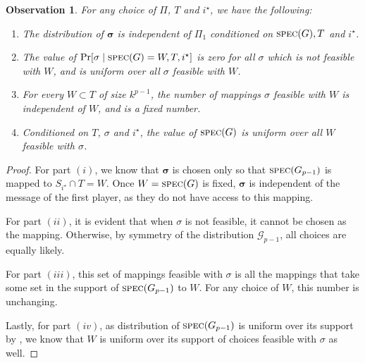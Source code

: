 \documentclass[11pt]{article}
\newtheorem{observation}[lemma]{Observation}
\theoremstyle{definition}
\DeclareMathOperator*{\Prob}{\ensuremath{\textnormal{Pr}}}
\renewcommand{\Pr}{\Prob}
\newcommand{\rv}[1]{\ensuremath{{\mathsf{#1}}}\xspace}
\newcommand{\cG}{\ensuremath{\mathcal{G}}}
\newcommand{\spec}{\ensuremath{\textnormal{\textsc{spec}}}}
\newcommand{\istar}{\ensuremath{i^{\star}}}
\newcommand{\Prot}{\ensuremath{\Pi}}
\newcommand{\rProt}{\ensuremath{\rv{\Prot}}}
\newcommand{\rsigma}{\ensuremath{\bm{\sigma}}}
\begin{document}
	\begin{observation}\label{obs:feasible-pair}
		For any choice of $\Prot$, $T$ and $\istar$, we have the following:
		\begin{enumerate}[label=$(\roman*)$]
			\item The distribution of $\rsigma$ is independent of $\rProt_1$ conditioned on $\spec(G), T$ and $\istar$. 
			\item The value of $\Pr[\sigma \mid \spec(G) = W, T, \istar]$ is zero for all $\sigma $ which is not feasible with $W$, and is uniform over all $\sigma$ feasible with $W$. 
			\item For every $W \subset T$ of size $k^{p-1}$, the number of mappings $\sigma$ feasible with $W$ is independent of $W$, and is a fixed number.
			\item Conditioned on $T$, $\sigma$ and $\istar$, the value of $\spec(G)$ is uniform over all $W$ feasible with $\sigma$.  
		\end{enumerate}
	\end{observation}
	\begin{proof}
		For part $(i)$, we know that $\rsigma$ is chosen only so that $\spec(G_{p-1})$ is mapped to $S_{\istar} \cap T = W$. Once $W = \spec(G)$ is fixed, $\rsigma$ is independent of the message of the first player, as they do not have access to this mapping. 
		
		For part $(ii)$, it is evident that when $\sigma$ is not feasible, it cannot be chosen as the mapping. Otherwise, by symmetry of the distribution $\cG_{p-1}$, all choices are equally likely. 
		
		For part $(iii)$, this set of mappings feasible with $\sigma$ is all the mappings that take some set in the support of $\spec(G_{p-1})$ to $W$. For any choice of $W$, this number is unchanging. 
		
		Lastly, for part $(iv)$, as distribution of $\spec(G_{p-1})$ is uniform over its support by , we know that $W$ is uniform over its support of choices feasible with $\sigma$ as well. 
	\end{proof}
	
\end{document}
